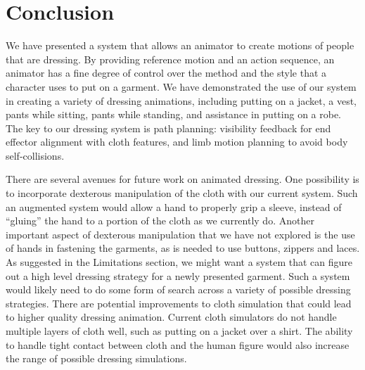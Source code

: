 \section{Conclusion}

We have presented a system that allows an animator to create motions of
people that are dressing.  By providing reference motion and an action
sequence, an animator has a fine degree of control over the method and the
style that a character uses to put on a garment.  We have demonstrated the
use of our system in creating a variety of dressing animations, including
putting on a jacket, a vest, pants while sitting, pants while standing,
and assistance in putting on a robe.  The key to our dressing system is
path planning: visibility feedback for end effector alignment with cloth
features, and limb motion planning to avoid body self-collisions.


There are several avenues for future work on animated dressing.  One
possibility is to incorporate dexterous manipulation of the cloth with our
current system.  Such an augmented system would allow a hand to properly
grip a sleeve, instead of ``gluing'' the hand to a portion of the cloth as
we currently do.  Another important aspect of dexterous manipulation that
we have not explored is the use of hands in fastening the garments, as is
needed to use buttons, zippers and laces.  As suggested in the Limitations
section, we might want a system that can figure out a high level dressing
strategy for a newly presented garment.  Such a system would likely need
to do some form of search across a variety of possible dressing
strategies.  There are potential improvements to cloth simulation that
could lead to higher quality dressing animation.  Current cloth simulators
do not handle multiple layers of cloth well, such as putting on a jacket
over a shirt.  The ability to handle tight contact between cloth and
the human figure would also increase the range of possible dressing
simulations.

